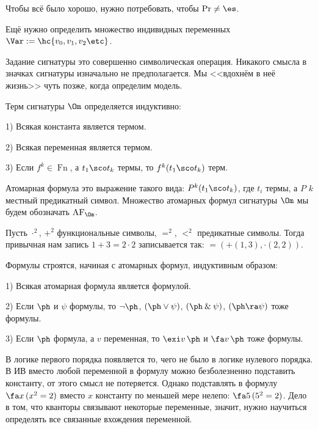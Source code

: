 \documentclass[a4paper,draft]{article}
\let\amper\&
\def\&{\mathbin{\amper}}
\DeclareMathOperator{\Fn}{Fn}
\DeclareMathOperator{\AF}{AF}
\begin{document}
Чтобы всё было хорошо, нужно потребовать, чтобы $\Pr \ne \es$.

Ещё нужно определить множество индивидных переменных $\Var := \hc{v_0,v_1,v_2\etc}$.


\begin{note}
  Задание сигнатуры это совершенно символическая операция. Никакого смысла в значках сигнатуры
  изначально не предполагается. Мы <<вдохнём в неё жизнь>> чуть позже, когда определим модель.
\end{note}

\begin{df}
  Терм сигнатуры $\Om$ определяется индуктивно:

  1) Всякая константа является термом.

  2) Всякая переменная является термом.

  3) Если $f^k \in \Fn$, а $t_1\sco t_k$ термы, то $f^k(t_1\sco t_k)$ терм.
\end{df}

\begin{df}
  Атомарная формула это выражение такого вида: $P^k(t_1\sco t_k)$, где $t_i$ термы,
  а $P$ $k$ местный предикатный символ.
  Множество атомарных формул сигнатуры $\Om$ мы будем обозначать $\AF_\Om$.
\end{df}

\begin{ex}
  Пусть $\cdot^2$, $+^2$ функциональные символы, $=^2$, $<^2$ предикатные символы.
  Тогда привычная нам запись $1 + 3 = 2\cdot 2$ записывается так:
  $=(+(1,3), \cdot(2,2))$.
\end{ex}

Формулы строятся, начиная с атомарных формул, индуктивным образом:
\begin{df}

  1) Всякая атомарная формула является формулой.

  2) Если $\ph$ и $\psi$ формулы, то $\neg \ph$, $(\ph \vee \psi)$, $(\ph \&\psi)$, $(\ph\ra \psi)$ тоже формулы.

  3) Если $\ph$ формула, а $v$ переменная, то $\exi v\, \ph$ и $\fa v\,\ph$ тоже формулы.
\end{df}

В логике первого порядка появляется то, чего не было в логике нулевого порядка. В ИВ вместо любой переменной
в формулу можно безболезненно подставить константу, от этого смысл не потеряется.
Однако подставлять в формулу $\fa x\, (x^2 = 2)$ вместо $x$ константу по меньшей мере нелепо:
$\fa 5\, (5^2 = 2)$. Дело в том, что кванторы связывают некоторые переменные,
значит, нужно научиться определять все связанные вхождения переменной.
\end{document}
